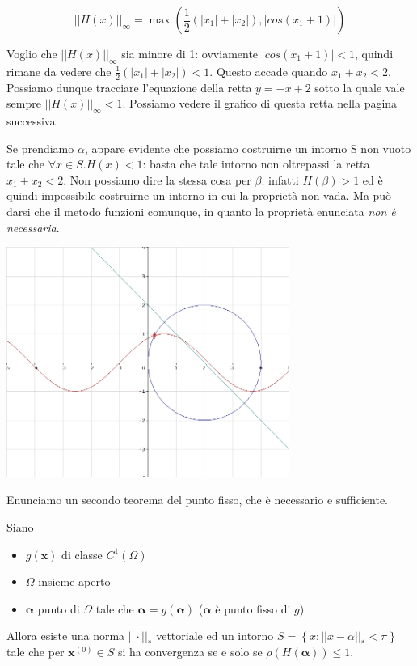 \begin{example}
$$ ||H(x) ||_{\infty} = \max(\frac{1}{2} (|x_{1}| + |x_{2}|), |
cos(x_1 + 1)|) $$

Voglio che $ || H(x) ||_{\infty} $ sia minore di 1: ovviamente $ |
cos(x_1 + 1)| < 1 $, quindi rimane da vedere che $ \frac{1}{2}
(|x_{1}| + |x_{2}|) < 1 $. Questo accade quando $ x_1 + x_2 < 2
$. Possiamo dunque tracciare l'equazione della retta $ y = - x + 2 $
sotto la quale vale sempre $ || H(x) || _{\infty} < 1 $. Possiamo
vedere il grafico di questa retta nella pagina successiva.

Se prendiamo $ \alpha $, appare evidente che possiamo costruirne un
intorno S non vuoto tale che $ \forall x \in S.H(x) < 1 $: basta che
tale intorno non oltrepassi la retta $ x_1 + x_2 < 2 $. Non possiamo
dire la stessa cosa per $ \beta $: infatti $ H(\beta) > 1 $ ed \`e
quindi impossibile costruirne un intorno in cui la propriet\`a non
vada. Ma pu\`o darsi che il metodo funzioni comunque, in quanto la
propriet\`a enunciata \emph{non \`e necessaria}.

\includegraphics[width=350px]{imgs/121702.jpg}
\end{example}

Enunciamo un secondo teorema del punto fisso, che \`e  necessario e
sufficiente.

\begin{theo}\label{theo:ptofisso2}
Siano
\begin{itemize}
\item $g(\mathbf{x})$ di classe $C^{1}(\Omega)$
\item $\Omega$ insieme aperto
\item $ \mathbf{\alpha} $ punto di $ \Omega $ tale che $ \mathbf{\alpha} = g(\mathbf{\alpha}) $
  ($ \mathbf{\alpha} $ \`e punto fisso di $g$)
\end{itemize}
Allora esiste una norma $|| \cdot ||_* $ vettoriale ed un intorno $ S
= \left\lbrace x : || x - \alpha ||_* < \pi \right\rbrace $ tale che
per $\mathbf{x}^{(0)}\in S$ si ha convergenza se e solo se $\rho(H(\mathbf{\alpha}))
\leq 1$.
\end{theo}

